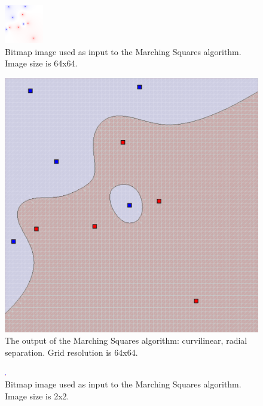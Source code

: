\documentclass[12pt]{article}
\begin{document}
\begin{figure} 
\centering
  \includegraphics[width = 3 in]{64_res_image.png}
  \caption{Bitmap image used as input to the Marching Squares algorithm. 
Image size is 64x64.
}
\end{figure}

\begin{figure} 
\centering
  \includegraphics[width = 3 in]{64_res.png}
  \caption{The output of the Marching Squares algorithm: curvilinear, radial separation. Grid resolution is 64x64.
}
\end{figure}







\begin{figure} 
\centering
  \includegraphics[width = 3 in]{image_avg_rectilinear.png}
  \caption{Bitmap image used as input to the Marching Squares algorithm.
Image size is 2x2.
}
\end{figure}
\end{document}
